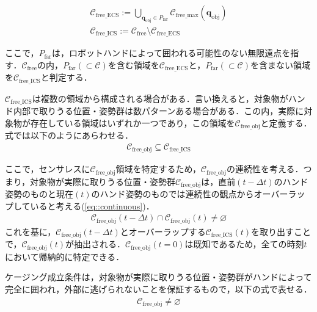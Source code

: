 \documentclass[a4paper,twoside,12pt,papersize, dvipdfmx]{iirthesis}
\begin{document}
\begin{gather}
\mathcal{C}_{\mathrm{free\_ECS}} := 
\bigcup_{\bm{q}_{\mathrm{obj}}\in P_{\mathrm{far}}}
\mathcal{C}_{\mathrm{free\_max}}(\bm{q}_{\mathrm{obj}}) \\
\mathcal{C}_{\mathrm{free\_ICS}} := \mathcal{C}_{\mathrm{free}} 
\setminus \mathcal{C}_{\mathrm{free\_ECS}}
\end{gather}

ここで，$P_{\mathrm{far}}$は，ロボットハンドによって囲われる可能性のない無限遠点を指す．$\mathcal{C}_{\mathrm{free}}$の内，$P_{\mathrm{far}} (\subset \mathcal{C})$を含む領域を$\mathcal{C}_{\mathrm{free\_ECS}}$と，$P_{\mathrm{far}} (\subset \mathcal{C})$を含まない領域を$\mathcal{C}_{\mathrm{free\_ICS}}$と判定する．\par

$\mathcal{C}_{\mathrm{free\_ICS}}$は複数の領域から構成される場合がある．言い換えると，対象物がハンド内部で取りうる位置・姿勢群は数パターンある場合がある．この内，実際に対象物が存在している領域はいずれか一つであり，この領域を$\mathcal{C}_{\mathrm{free\_obj}}$と定義する．式では以下のようにあらわせる．
\begin{gather}
\mathcal{C}_{\mathrm{free\_obj}} \subseteq \mathcal{C}_{\mathrm{free\_ICS}}
\end{gather}

ここで，センサレスに$\mathcal{C}_{\mathrm{free\_obj}}$領域を特定するため，$\mathcal{C}_{\mathrm{free\_obj}}$の連続性を考える．つまり，対象物が実際に取りうる位置・姿勢群$\mathcal{C}_{\mathrm{free\_obj}}$は，直前$(t-\Delta t)$のハンド姿勢のものと現在$(t)$のハンド姿勢のものでは連続性の観点からオーバーラップしていると考える(\eqref{eq::continuous})．
\begin{gather}\label{eq::sicm::continuous}
\mathcal{C}_{\mathrm{free\_obj}}(t-\Delta t) \cap 
\mathcal{C}_{\mathrm{free\_obj}}(t) \neq \varnothing
\end{gather}
これを基に，$\mathcal{C}_{\mathrm{free\_obj}}(t-\Delta t)$とオーバーラップする$\mathcal{C}_{\mathrm{free\_ICS}}(t)$を取り出すことで，$\mathcal{C}_{\mathrm{free\_obj}}(t)$が抽出される．$\mathcal{C}_{\mathrm{free\_obj}}(t=0)$は既知であるため，全ての時刻$t$において帰納的に特定できる．

ケージング成立条件は，対象物が実際に取りうる位置・姿勢群がハンドによって完全に囲われ，外部に逃げられないことを保証するもので，以下の式で表せる．
\begin{gather}
\mathcal{C}_{\mathrm{free\_obj}} \neq \varnothing
\end{gather}
\end{document}
